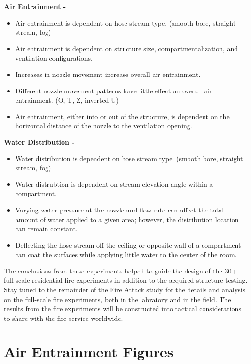 \documentclass{article}
\begin{document}
\vspace*{\baselineskip}
\noindent \bf{Air Entrainment} -
\normalfont
\begin{itemize}
	\item Air entrainment is dependent on hose stream type. (smooth bore, straight stream, fog)
	\item Air entrainment is dependent on structure size, compartmentalization, and ventilation configurations.
	\item Increases in nozzle movement increase overall air entrainment.
	\item Different nozzle movement patterns have little effect on overall air entrainment. (O, T, Z, inverted U)
	\item Air entrainment, either into or out of the structure, is dependent on the horizontal distance of the nozzle to the ventilation opening.
	\end{itemize}
\vspace*{\baselineskip}
\noindent \bf{Water Distribution} -
\normalfont
\begin{itemize}
	\item Water distribution is dependent on hose stream type. (smooth bore, straight stream, fog)
	\item Water distrubtion is dependent on stream elevation angle within a compartment.
	\item Varying water pressure at the nozzle and flow rate can affect the total amount of water applied to a given area; however, the distribution location can remain constant.
	\item Deflecting the hose stream off the ceiling or opposite wall of a compartment can coat the surfaces while applying little water to the center of the room.
	\end{itemize}
\vspace*{\baselineskip}

The conclusions from these experiments helped to guide the design of the 30+ full-scale residential fire experiments in addition to the acquired structure testing. Stay tuned to the remainder of the Fire Attack study for the details and analysis on the full-scale fire experiments, both in the labratory and in the field. The results from the fire experiments will be constructed into tactical considerations to share with the fire service worldwide.




\appendix

\section{Air Entrainment Figures}
\label{app:Air_Entrainment_Figures}
\end{document}
